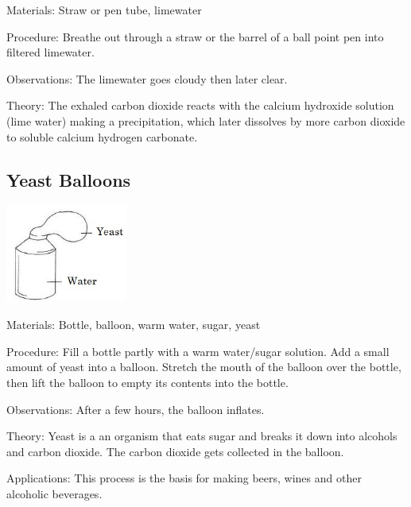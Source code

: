 \begin{multicols}{2}
\begin{description*}
\item[Materials:]{Straw or pen tube, limewater}
\item[Procedure:]{Breathe out through a straw or the barrel of a ball point pen into filtered limewater.}
\item[Observations:]{The limewater goes cloudy then later clear.}
\item[Theory:]{The exhaled carbon dioxide reacts with the calcium hydroxide solution (lime water) making a precipitation, which later dissolves by more carbon dioxide to soluble calcium hydrogen
carbonate.}
\end{description*}

\subsection{Yeast Balloons} %

\begin{center}
\includegraphics[width=0.3\textwidth]{./img/vso/yeast-balloon.jpg}
\end{center}

\begin{description*}
\item[Materials:]{Bottle, balloon, warm water, sugar, yeast}
\item[Procedure:]{Fill a bottle partly with a warm water/sugar solution. Add a small amount of yeast into a balloon. Stretch the mouth of the balloon over the bottle, then lift the balloon to empty its contents into the bottle.}
\item[Observations:]{After a few hours, the balloon inflates.}
\item[Theory:]{Yeast is a an organism that eats sugar and breaks it down into alcohols and carbon dioxide. The carbon dioxide gets collected in the balloon.}
\item[Applications:]{This process is the basis for making beers, wines and other alcoholic beverages.}
\end{description*}


\end{multicols}

